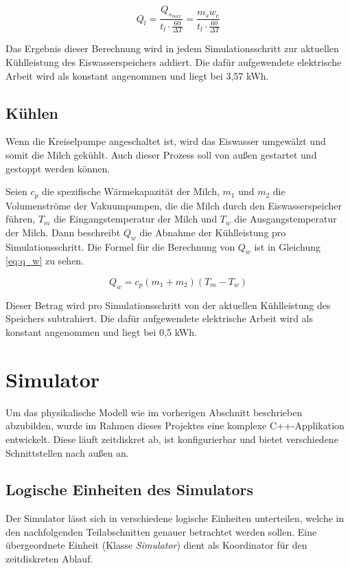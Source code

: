 \begin{equation}\label{eq:q_l}
Q_l = \frac{Q_{s_{max}}}{t_l \cdot \frac{60}{\Delta T}} = \frac{m_s w_e}{t_l \cdot \frac{60}{\Delta T}}
\end{equation}

Das Ergebnis dieser Berechnung wird in jedem Simulationsschritt zur aktuellen Kühlleistung des Eiswasserspeichers addiert. Die dafür aufgewendete elektrische Arbeit wird als konstant angenommen und liegt bei 3,57 kWh.

\subsection{Kühlen}
Wenn die Kreiselpumpe angeschaltet ist, wird das Eiswasser umgewälzt und somit die Milch gekühlt. Auch dieser Prozess soll von außen gestartet und gestoppt werden können.

Seien $ c_p $ die spezifische Wärmekapazität der Milch, $ m_1 $ und $ m_2 $ die Volumenströme der Vakuumpumpen, die die Milch durch den Eiswasserspeicher führen, $ T_m $ die Eingangstemperatur der Milch und $ T_w $ die Ausgangstemperatur der Milch. Dann beschreibt $ Q_w $ die Abnahme der Kühlleistung pro Simulationsschritt. Die Formel für die Berechnung von $ Q_w $ ist in Gleichung \ref{eq:q_w} zu sehen.

\begin{equation}\label{eq:q_w}
Q_w = c_p (m_1 + m_2) (T_m - T_w)
\end{equation}

Dieser Betrag wird pro Simulationsschritt von der aktuellen Kühlleistung des Speichers subtrahiert. Die dafür aufgewendete elektrische Arbeit wird als konstant angenommen und liegt bei 0,5 kWh.

\section{Simulator}
\label{software_simulator}

Um das physikalische Modell wie im vorherigen Abschnitt beschrieben abzubilden, wurde im Rahmen dieses Projektes eine komplexe C++-Applikation entwickelt. Diese läuft zeitdiskret ab, ist konfigurierbar und bietet verschiedene Schnittstellen nach außen an. 

\subsection{Logische Einheiten des Simulators}
Der Simulator lässt sich in verschiedene logische Einheiten unterteilen, welche in den nachfolgenden Teilabschnitten genauer betrachtet werden sollen. Eine übergeordnete Einheit (Klasse \emph{Simulator}) dient als Koordinator für den zeitdiskreten Ablauf.

